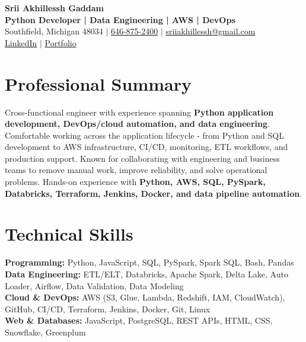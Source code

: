 \documentclass[letterpaper,10pt]{article}
\begin{document}
\fontsize{9.35pt}{10.45pt}\selectfont

\begin{center}
    {\LARGE \textbf{Srii Akhillessh Gaddam}} \\[-1pt]
    \textbf{Python Developer | Data Engineering | AWS | DevOps} \\[2pt]
    Southfield, Michigan 48034 $|$
    \href{tel:6468752400}{646-875-2400} $|$
    \href{mailto:sriiakhillessh@gmail.com}{sriiakhillessh@gmail.com} \\[1pt]
    \href{https://www.linkedin.com/in/srii-akhiilessh-gaddam-b48668191/}{LinkedIn} $|$
    \href{https://sriiakhillesshg.github.io/portfolio/}{Portfolio}
\end{center}
\vspace{-8pt}

\section{Professional Summary}
\small{Cross-functional engineer with experience spanning \textbf{Python application development, DevOps/cloud automation, and data engineering}. Comfortable working across the application lifecycle - from Python and SQL development to AWS infrastructure, CI/CD, monitoring, ETL workflows, and production support. Known for collaborating with engineering and business teams to remove manual work, improve reliability, and solve operational problems. Hands-on experience with \textbf{Python, AWS, SQL, PySpark, Databricks, Terraform, Jenkins, Docker, and data pipeline automation}.}

\section{Technical Skills}
\small{
\textbf{Programming:} Python, JavaScript, SQL, PySpark, Spark SQL, Bash, Pandas \\
\textbf{Data Engineering:} ETL/ELT, Databricks, Apache Spark, Delta Lake, Auto Loader, Airflow, Data Validation, Data Modeling \\
\textbf{Cloud \& DevOps:} AWS (S3, Glue, Lambda, Redshift, IAM, CloudWatch), GitHub, CI/CD, Terraform, Jenkins, Docker, Git, Linux \\
\textbf{Web \& Databases:} JavaScript, PostgreSQL, REST APIs, HTML, CSS, Snowflake, Greenplum
}
\end{document}
